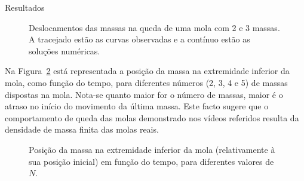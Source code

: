 \documentclass[final]{beamer}
\newlength{\colwidth}
\begin{document}
\begin{frame}[t,fragile]
\begin{columns}[t]
\begin{column}{\colwidth}
\begin{block}{Resultados}
\begin{figure}
\begin{tikzpicture}
		\end{tikzpicture}
		\caption{\label{fig:a} Deslocamentos das massas na queda de uma mola com 2 e 3 massas. A tracejado estão as curvas observadas e a contínuo estão as soluções numéricas.}
	\end{figure}
	\vspace{2cm}
Na Figura~\ref{fig:b} está representada a posição da massa na extremidade inferior da
mola, como função do tempo, para diferentes números (2, 3, 4 e 5) de massas
dispostas na mola. Nota-se quanto maior for o número de massas, maior é o
atraso no início do movimento da última massa. Este facto sugere que o
comportamento de queda das molas demonstrado nos vídeos referidos resulta da
densidade de massa finita das molas reais.
\vspace{2cm}
	\begin{figure}
		\caption{\label{fig:b} Posição da massa na extremidade inferior da mola (relativamente à sua posição inicial) em função do tempo, para diferentes valores de $N$.}
	\end{figure}
\end{block}



\end{column}
\end{columns}
\end{frame}
\end{document}
